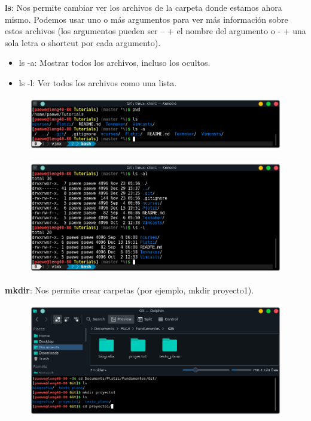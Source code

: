 \documentclass{article}
\begin{document}
\textbf{ls}: Nos permite cambiar ver los archivos de la carpeta donde estamos
ahora mismo. Podemos usar uno o más argumentos para ver más información sobre
estos archivos (los argumentos pueden ser -- + el nombre del argumento o - +
una sola letra o shortcut por cada argumento).

\begin{itemize}
    \item ls -a: Mostrar todos los archivos, incluso los ocultos.
    \item ls -l: Ver todos los archivos como una lista.
\end{itemize}

\begin{figure}[h!]
  \centering
  \includegraphics[scale=0.75]{./Pictures/059_ls.png}
\end{figure}

\newpage

\begin{figure}[h!]
  \centering
  \includegraphics[scale=0.75]{./Pictures/060_ls_al.png}
\end{figure}

\textbf{mkdir}: Nos permite crear carpetas (por ejemplo, mkdir
proyecto1).

\begin{figure}[h!]
  \centering
  \includegraphics[scale=0.7]{./Pictures/061_mkdir.png}
\end{figure}
\end{document}
